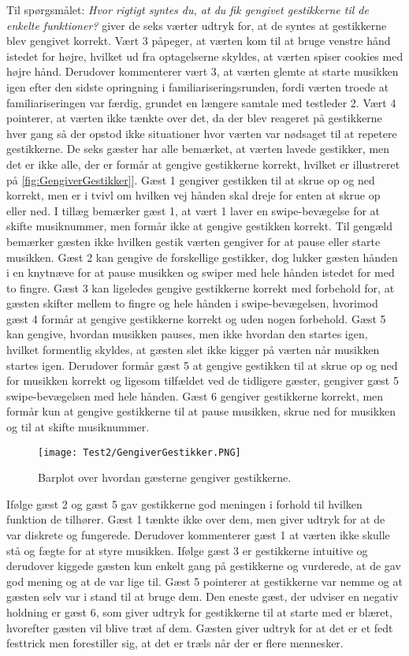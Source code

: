 Til spørgsmålet: \textit{Hvor rigtigt syntes du, at du fik gengivet gestikkerne til de enkelte funktioner?} giver de seks værter udtryk for, at de syntes at gestikkerne blev gengivet korrekt. Vært 3 påpeger, at værten kom til at bruge venstre hånd istedet for højre, hvilket ud fra optagelserne skyldes, at værten spiser cookies med højre hånd. Derudover kommenterer vært 3, at værten glemte at starte musikken igen efter den sidste opringning i familiariseringsrunden, fordi værten troede at familiariseringen var færdig, grundet en længere samtale med testleder 2. Vært 4 pointerer, at værten ikke tænkte over det, da der blev reageret på gestikkerne hver gang så der opstod ikke situationer hvor værten var nødsaget til at repetere gestikkerne. \blankline
%
De seks gæster har alle bemærket, at værten lavede gestikker, men det er ikke alle, der er formår at gengive gestikkerne korrekt, hvilket er illustreret på \autoref{fig:GengiverGestikker}]. Gæst 1 gengiver gestikken til at skrue op og ned korrekt, men er i tvivl om hvilken vej hånden skal dreje for enten at skrue op eller ned. I tillæg bemærker gæst 1, at vært 1 laver en swipe-bevægelse for at skifte musiknummer, men formår ikke at gengive gestikken korrekt. Til gengæld bemærker gæsten ikke hvilken gestik værten gengiver for at pause eller starte musikken. Gæst 2 kan gengive de forskellige gestikker, dog lukker gæsten hånden i en knytnæve for at pause musikken og swiper med hele hånden istedet for med to fingre. Gæst 3 kan ligeledes gengive gestikkerne korrekt med forbehold for, at gæsten skifter mellem to fingre og hele hånden i swipe-bevægelsen, hvorimod gæst 4 formår at gengive gestikkerne korrekt og uden nogen forbehold. Gæst 5 kan gengive, hvordan musikken pauses, men ikke hvordan den startes igen, hvilket formentlig skyldes, at gæsten slet ikke kigger på værten når musikken startes igen. Derudover formår gæst 5 at gengive gestikken til at skrue op og ned for musikken korrekt og ligesom tilfældet ved de tidligere gæster, gengiver gæst 5 swipe-bevægelsen med hele hånden. Gæst 6 gengiver gestikkerne korrekt, men formår kun at gengive gestikkerne til at pause musikken, skrue ned for musikken og til at skifte musiknummer. 
%
\begin{figure}[H]
	\centering
	\texttt{[image: Test2/GengiverGestikker.PNG]}
	\caption{Barplot over hvordan gæsterne gengiver gestikkerne.}
	\label{fig:GengiverGestikker}
\end{figure}
\noindent
% 
Ifølge gæst 2 og gæst 5 gav gestikkerne god meningen i forhold til hvilken funktion de tilhører. Gæst 1 tænkte ikke over dem, men giver udtryk for at de var diskrete og fungerede. Derudover kommenterer gæst 1 at værten ikke skulle stå og fægte for at styre musikken. Ifølge gæst 3 er gestikkerne intuitive og derudover kiggede gæsten kun enkelt gang på gestikkerne og vurderede, at de gav god mening og at de var lige til. Gæst 5 pointerer at gestikkerne var nemme og at gæsten selv var i stand til at bruge dem. Den eneste gæst, der udviser en negativ holdning er gæst 6, som giver udtryk for gestikkerne til at starte med er blæret, hvorefter gæsten vil blive træt af dem. Gæsten giver udtryk for at det er et fedt festtrick men forestiller sig, at det er træls når der er flere mennesker.
%

